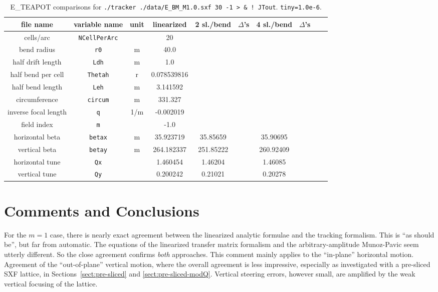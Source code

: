 \documentclass[12pt]{article}
\begin{document}
%
\begin{table}[h]
\caption{\label{tbl:benchmarkParams.M1.0_}E\_TEAPOT comparisons for
{\tt ./tracker ./data/E\_BM\_M1.0.sxf 30 -1 > \& ! JTout}. {\tt tiny=1.0e-6}.
} 
\medskip
\centering
\begin{tabular}{|c|c|c|c|c|c|c|c|c|c|}           \hline
file name         & variable name     & unit & linearized    & 2 sl./bend & $\Delta$'s &4 sl./bend & $\Delta$'s   \\ \hline
cells/arc         & {\tt NCellPerArc} &      &      20       &  &  & &  \\
bend radius       &  {\tt r0}         &  m   &     40.0      &  &  & & \\
half drift length &  {\tt Ldh}        &  m   &      1.0      &  &  & & \\
half bend per cell & {\tt Thetah}     &  r   &   0.078539816 &  &  & & \\
half bend length  & {\tt Leh}         &  m   &    3.141592   &  &  & & \\
circumference     & {\tt circum}      &  m   &   331.327     &  &  & & \\
inverse focal length &  {\tt q}       & 1/m  &    -0.002019  &  &  & & \\ 
field index       &  {\tt m}          &      &     -1.0     &  &  & & \\ \hline
horizontal beta  & {\tt betax}       &  m   &    35.923719   &  35.85659 & & 35.90695 & \\ 
vertical beta     & {\tt betay}       &  m   &  264.182337   & 251.85222 & & 260.92409 & \\ 
horizontal tune  &  {\tt Qx}         &      &     1.460454   &   1.46204 & &   1.46085 & \\ 
vertical tune     &  {\tt Qy}         &      &    0.200242   &   0.21021 & &  0.20278 & \\ \hline
\end{tabular}
\end{table}
%




\clearpage

\section{Comments and Conclusions}
For the $m=1$ case, there is nearly exact agreement between the linearized analytic formulae and the tracking formalism. 
This is ``as should be'', but far from automatic. The equations of the linearized transfer matrix formalism and the 
arbitrary-amplitude Munoz-Pavic seem utterly different. So the close agreement confirms \emph{both} approaches.
This comment mainly applies to the ``in-plane'' horizontal motion. Agreement of the ``out-of-plane'' vertical
motion, where the overall agreement is less impressive, especially as investigated with a pre-sliced SXF lattice,
in Sections~\ref{sect:pre-sliced} and \ref{sect:pre-sliced-modQ}. Vertical steering errors, however small, are 
amplified by the weak vertical focusing of the lattice. 
\end{document}

